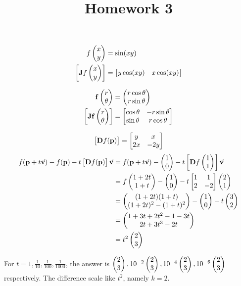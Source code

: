\documentclass{homework}
\title{Homework 3}
\begin{document}
\maketitle

\begin{problem}{1}
\begin{align*}
  f\pmat{x\\y} &= \sin(xy)\\
  \bmat{\mathbf{J}f\pmat{x\\y}} &= \bmat{y\cos(xy) & x\cos(xy)}
\end{align*}

\begin{align*}
  \mathbf{f}\pmat{r\\\theta} &= \pmat{r\cos\theta\\r\sin\theta} \\
  \bmat{\mathbf{Jf}\pmat{r\\\theta}} &= \bmat{\cos\theta & -r\sin\theta\\\sin\theta & r\cos\theta}
\end{align*}
\end{problem}

\begin{problem}{2}
$$\bmat{\mathbf{D}f(\mathbf{p})} = \bmat{y & x \\ 2x & -2y}$$
\begin{align*}
f(\mathbf{p}+t\vec{\mathbf{v}})-f(\mathbf{p})-t\bmat{\mathbf{D}f(\mathbf{p})}\vec{\mathbf{v}} &=
f(\mathbf{p}+t\vec{\mathbf{v}})-\pmat{1\\0}-t\bmat{\mathbf{D}f\pmat{1\\1}}\vec{\mathbf{v}} \\ &=
f\pmat{1+2t\\1+t}-\pmat{1\\0}-t\bmat{1&1\\2&-2}\pmat{2\\1} \\ &=
\pmat{(1+2t)(1+t)\\(1+2t)^2 - (1+t)^2} - \pmat{1\\0} - t\pmat{3\\2} \\ &=
\pmat{1+3t+2t^2-1-3t\\2t+3t^3-2t} \\ &=
t^2\pmat{2\\3}
\end{align*}

For $t = 1, \frac{1}{10}, \frac{1}{100}, \frac{1}{1000}$, the answer is $\pmat{2\\3}, 10^{-2}\pmat{2\\3}, 10^{-4}\pmat{2\\3}, 10^{-6}\pmat{2\\3}$ respectively. The difference scale like $t^2$, namely $k = 2$.
\end{problem}
\end{document}
